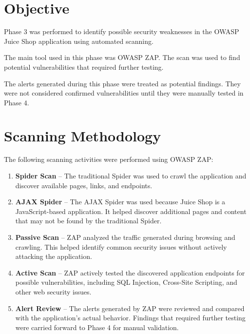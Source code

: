 \section{Objective}

Phase 3 was performed to identify possible security weaknesses in
the OWASP Juice Shop application using automated scanning.

The main tool used in this phase was OWASP ZAP. The scan was used to
find potential vulnerabilities that required further testing.

The alerts generated during this phase were treated as potential
findings. They were not considered confirmed vulnerabilities until
they were manually tested in Phase 4.

\section{Scanning Methodology}

The following scanning activities were performed using OWASP ZAP:

\begin{enumerate}

    \item \textbf{Spider Scan} -- The traditional Spider was used to
    crawl the application and discover available pages, links, and
    endpoints.

    \item \textbf{AJAX Spider} -- The AJAX Spider was used because
    Juice Shop is a JavaScript-based application. It helped discover
    additional pages and content that may not be found by the
    traditional Spider.

    \item \textbf{Passive Scan} -- ZAP analyzed the traffic generated
    during browsing and crawling. This helped identify common
    security issues without actively attacking the application.

    \item \textbf{Active Scan} -- ZAP actively tested the discovered
    application endpoints for possible vulnerabilities, including
    SQL Injection, Cross-Site Scripting, and other web security
    issues.

    \item \textbf{Alert Review} -- The alerts generated by ZAP were
    reviewed and compared with the application's actual behavior.
    Findings that required further testing were carried forward to
    Phase 4 for manual validation.

\end{enumerate}

